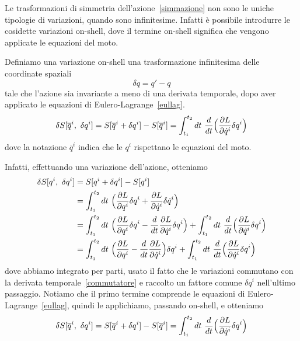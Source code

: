     Le trasformazioni di simmetria dell'azione~\eqref{simmazione} non sono le uniche tipologie di variazioni, quando sono infinitesime. Infatti è possibile introdurre le cosidette variazioni on-shell, dove il termine on-shell significa che vengono applicate le equazioni del moto. 
    \begin{definition}
        Definiamo una variazione on-shell una trasformazione infinitesima delle coordinate spaziali 
    \begin{equation*}
        \delta q = q' - q
    \end{equation*} 
        tale che l'azione sia invariante a meno di una derivata temporale, dopo aver applicato le equazioni di Eulero-Lagrange~\eqref{eullag}. 
    \begin{equation} \label{invonshell}
        \delta S[\overline q^i,~\delta q^i] = S[\overline q^i + \delta q^i] - S[\overline q^i] = \int_{t_1}^{t_2}dt~ \frac{d}{dt} \Big( \frac{\partial L}{\partial\dot q^i} \delta q^i \Big )
    \end{equation}  
        dove la notazione $\overline q^i$ indica che le $q^i$ rispettano le equazioni del moto. 
    \end{definition}     

    Infatti, effettuando una variazione dell'azione, otteniamo 
    \begin{equation*}
    \begin{aligned}
        \delta S[q^i,~\delta q^i] & = S[q^i + \delta q^i] - S[q^i] \\ & = \int_{t_1}^{t_2}dt~ \Big( \frac{\partial L}{\partial q^i} \delta q^i + \frac{\partial L}{\partial\dot q^i} \delta \dot q^i \Big) \\ &= \int_{t_1}^{t_2}dt~ \Big( \frac{\partial L}{\partial q^i}  \delta q^i - \frac{d}{dt} \frac{\partial L}{\partial\dot q^i}  \delta q^i \Big )+ \int_{t_1}^{t_2}dt~ \frac{d}{dt} \Big( \frac{\partial L}{\partial\dot q^i} \delta q^i \Big ) \\ & = \int_{t_1}^{t_2}dt~ \Big( \frac{\partial L}{\partial q^i}  - \frac{d}{dt} \frac{\partial L}{\partial\dot q^i} \Big ) \delta q^i + \int_{t_1}^{t_2}dt~ \frac{d}{dt} \Big( \frac{\partial L}{\partial\dot q^i} \delta q^i \Big )
    \end{aligned}
    \end{equation*}
    dove abbiamo integrato per parti, usato il fatto che le variazioni commutano con la derivata temporale~\eqref{commutatore} e raccolto un fattore comune $\delta q^i$ nell'ultimo passaggio.
    Notiamo che il primo termine comprende le equazioni di Eulero-Lagrange~\eqref{eullag}, quindi le applichiamo, passando on-shell, e otteniamo 
    \begin{equation*} 
        \delta S[\overline q^i,~\delta q^i] = S[\overline q^i + \delta q^i] - S[\overline q^i] = \int_{t_1}^{t_2}dt~ \frac{d}{dt} \Big( \frac{\partial L}{\partial\dot q^i} \delta q^i \Big )
    \end{equation*}

